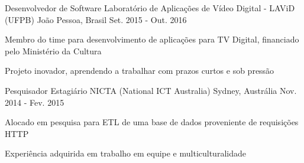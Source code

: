 \begin{cventries}

\cventry
    {Desenvolvedor de Software} %
    {Laboratório  de Aplicações de Vídeo Digital - LAViD (UFPB)} %
    {João Pessoa, Brasil} %
    {Set. 2015 - Out. 2016} %
    {
      \begin{cvitems} %
        \item {Membro do time para desenvolvimento de aplicações para TV Digital, financiado pelo Ministério da Cultura}
        \item {Projeto inovador, aprendendo a trabalhar com prazos curtos e sob pressão}
      \end{cvitems}
    }
%

  \cventry
    {Pesquisador Estagiário} %
    {NICTA (National ICT Australia)} %
    {Sydney, Austrália} %
    {Nov. 2014 - Fev. 2015} %
    {
      \begin{cvitems} %
        \item {Alocado em pesquisa para ETL de uma base de dados proveniente de requisições HTTP}
        \item {Experiência adquirida em trabalho em equipe e multiculturalidade}
      \end{cvitems}
    }


\end{cventries}
